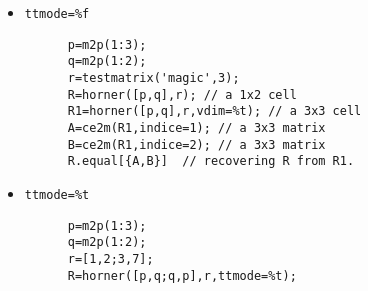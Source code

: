 \begin{examples}
  \begin{itemize}
  \item \verb!ttmode=%f!
    \begin{Verbatim}
      p=m2p(1:3);
      q=m2p(1:2);
      r=testmatrix('magic',3);
      R=horner([p,q],r); // a 1x2 cell 
      R1=horner([p,q],r,vdim=%t); // a 3x3 cell
      A=ce2m(R1,indice=1); // a 3x3 matrix 
      B=ce2m(R1,indice=2); // a 3x3 matrix 
      R.equal[{A,B}]  // recovering R from R1.
    \end{Verbatim}
  \item \verb!ttmode=%t!
    \begin{Verbatim}
      p=m2p(1:3);
      q=m2p(1:2);
      r=[1,2;3,7];
      R=horner([p,q;q,p],r,ttmode=%t);
    \end{Verbatim}
  \end{itemize}
\end{examples}

